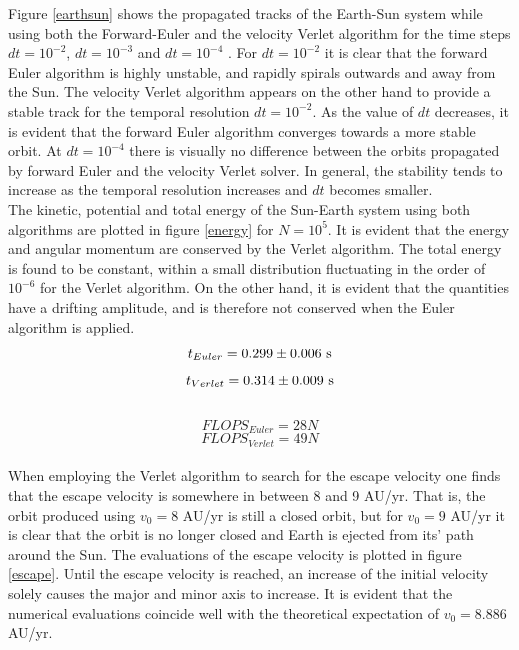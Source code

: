 \documentclass[%
reprint,nofootinbib,
amsmath,amssymb,
aps,
]{revtex4-1}
\begin{document}
\vspace{15mm}

\twocolumngrid

\noindent 
Figure \ref{earthsun} shows the propagated tracks of the Earth-Sun system while using both the Forward-Euler and the velocity Verlet algorithm for the time steps $dt = 10^{-2}$, $dt = 10^{-3}$ and $dt = 10^{-4}$ . For $dt = 10^{-2}$ it is clear that the forward Euler algorithm is highly unstable, and rapidly spirals outwards and away from the Sun. The velocity Verlet algorithm appears on the other hand to provide a stable track for the temporal resolution $dt = 10^{-2}$. As the value of $dt$ decreases, it is evident that the forward Euler algorithm converges towards a more stable orbit. At $dt = 10^{-4}$ there is visually no difference between the orbits propagated by forward Euler and the velocity Verlet solver. In general, the stability tends to increase as the temporal resolution increases and $dt$ becomes smaller. \\ \indent 
The kinetic, potential and total energy of the Sun-Earth system using both algorithms are plotted in figure \ref{energy} for $N = 10^5$. It is evident that the energy and angular momentum are conserved by the Verlet algorithm. The total energy is found to be constant, within a small distribution fluctuating in the order of $10^{-6}$ for the Verlet algorithm. On the other hand, it is evident that the quantities have a drifting amplitude, and is therefore not conserved when the Euler algorithm is applied. \\
\begin{equation*}
	t_{Euler} = 0.299 \pm 0.006 \textnormal{ s}
\end{equation*}
\begin{equation*}
t_{Verlet} =0.314 \pm 0.009 \textnormal{ s}
\end{equation*} \\ 
\begin{equation*}
	FLOPS_{Euler} = 28N
\end{equation*}
\begin{equation*}
FLOPS_{Verlet} = 49N
\end{equation*}\\ 
\noindent 
When employing the Verlet algorithm to search for the escape velocity one finds that the escape velocity is somewhere in between 8 and 9 AU/yr. That is, the orbit produced using $v_0 = 8$ AU/yr is still a closed orbit, but for $v_0 = 9$ AU/yr it is clear that the orbit is no longer closed and Earth is ejected from its' path around the Sun. The evaluations of the escape velocity is plotted in figure \ref{escape}. Until the escape velocity is reached, an increase of the initial velocity solely causes the major and minor axis to increase. It is evident that the numerical evaluations coincide well with the theoretical expectation of $v_0 = 8.886$ AU/yr. \\ 
\end{document}
